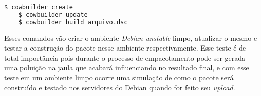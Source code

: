 \begin{lstlisting}[language=bash]
	$ cowbuilder create
	$ cowbuilder update
	$ cowbuilder build arquivo.dsc
\end{lstlisting} 

Esses comandos vão criar o ambiente \textit{Debian unstable} limpo, atualizar o mesmo e testar a construção do pacote nesse ambiente respectivamente. Esse teste é de total importância pois durante o processo de empacotamento pode ser gerada uma poluição na jaula que acabará influenciando no resultado final, e com esse teste em um ambiente limpo ocorre uma simulação de como o pacote será construído e testado nos servidores do Debian quando for feito seu \textit{upload}.